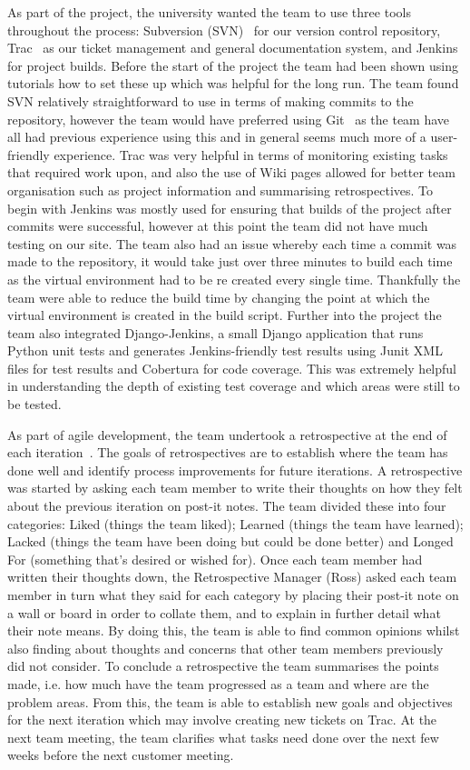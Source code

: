 \documentclass{l3proj}
\begin{document}
As part of the project, the university wanted the team to use three tools throughout the process: Subversion (SVN)~\cite{SVN} for our version control repository, Trac~\cite{Trac} as our ticket management and general documentation system, and Jenkins~\cite{Jenkins} for project builds. Before the start of the project the team had been shown using tutorials how to set these up which was helpful for the long run. The team found SVN relatively straightforward to use in terms of making commits to the repository, however the team would have preferred using Git~\cite{Git} as the team have all had previous experience using this and in general seems much more of a user-friendly experience. Trac was very helpful in terms of monitoring existing tasks that required work upon, and also the use of Wiki pages allowed for better team organisation such as project information and summarising retrospectives. To begin with Jenkins was mostly used for ensuring that builds of the project after commits were successful, however at this point the team did not have much testing on our site. The team also had an issue whereby each time a commit was made to the repository, it would take just over three minutes to build each time as the virtual environment had to be re created every single time. Thankfully the team were able to reduce the build time by changing the point at which the virtual environment is created in the build script. Further into the project the team also integrated Django-Jenkins, a small Django application that runs Python unit tests and generates Jenkins-friendly test results using Junit XML files for test results and Cobertura for code coverage. This was extremely helpful in understanding the depth of existing test coverage and which areas were still to be tested.

As part of agile development, the team undertook a retrospective at the end of each iteration~\cite{Retrospectives}. The goals of retrospectives are to establish where the team has done well and identify process improvements for future iterations. A retrospective was started by asking each team member to write their thoughts on how they felt about the previous iteration on post-it notes. The team divided these into four categories: Liked (things the team liked); Learned (things the team have learned); Lacked (things the team have been doing but could be done better) and Longed For (something that's desired or wished for). Once each team member had written their thoughts down, the Retrospective Manager (Ross) asked each team member in turn what they said for each category by placing their post-it note on a wall or board in order to collate them, and to explain in further detail what their note means. By doing this, the team is able to find common opinions whilst also finding about thoughts and concerns that other team members previously did not consider. To conclude a retrospective the team summarises the points made, i.e. how much have the team progressed as a team and where are the problem areas. From this, the team is able to establish new goals and objectives for the next iteration which may involve creating new tickets on Trac. At the next team meeting, the team clarifies what tasks need done over the next few weeks before the next customer meeting.
\end{document}
